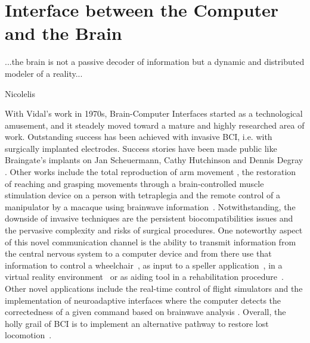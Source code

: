 \chapter{Interface between the Computer and the Brain}
\label{chapter:one}

\epigraph{...the brain is not a passive decoder of information but a dynamic and distributed modeler of a reality...}{Nicolelis}


\vspace{10px}




With Vidal's work in 1970s, Brain-Computer Interfaces started as a technological amusement, and it steadely moved toward a mature and highly researched area of work.  Outstanding success has been achieved with invasive BCI, i.e. with surgically implanted electrodes. Success stories have been made public like Braingate's implants on Jan Scheuermann, Cathy Hutchinson and Dennis Degray \cite{Pandarinath2017}.  Other works include the total reproduction of arm movement \cite{c27}, the restoration of reaching and grasping movements through a brain-controlled muscle stimulation device on a person with tetraplegia \cite{Ajiboye2017} and the remote control of a manipulator by a macaque using brainwave information~\cite{c29}.  Notwithstanding, the downside of invasive techniques are the persistent biocompatibilities issues and the pervasive complexity and risks of surgical procedures. One noteworthy aspect of this novel communication channel is the ability to transmit information from the central nervous system to a computer device and from there use that information to control a wheelchair~\cite{Carlson2013}, as input to a speller application~\cite{Guger2009a}, in a virtual reality environment~\cite{Lotte2013} or as aiding tool in a rehabilitation procedure~\cite{Jure2016}.  Other novel applications include the real-time control of flight simulators \cite{Nourmohammadi2018} and the implementation of neuroadaptive interfaces where the computer detects the correctedness of a given command based on brainwave analysis \cite{Zander2016}.  Overall, the holly grail of BCI is to implement an alternative pathway to restore lost locomotion~\cite{WolpawJonathanR2012}.


